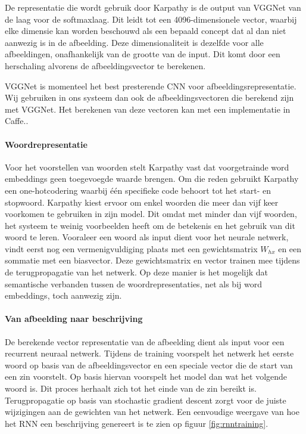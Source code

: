 De representatie die wordt gebruik door Karpathy is de output van VGGNet van de laag voor de softmaxlaag. Dit leidt tot een 4096-dimensionele vector, waarbij elke dimensie kan worden beschouwd als een bepaald concept dat al dan niet aanwezig is in de afbeelding. Deze dimensionaliteit is dezelfde voor alle afbeeldingen, onafhankelijk van de grootte van de input. Dit komt door een herschaling alvorens de afbeeldingsvector te berekenen.

VGGNet is momenteel het best presterende CNN voor afbeeldingsrepresentatie. Wij gebruiken in ons systeem dan ook de afbeeldingsvectoren die berekend zijn met VGGNet. Het berekenen van deze vectoren kan met een implementatie in Caffe.\cite{Jia2014}.

\paragraph{Woordrepresentatie}
Voor het voorstellen van woorden stelt Karpathy\cite{Karpathy2015} vast dat voorgetrainde word embeddings geen toegevoegde waarde brengen. Om die reden gebruikt Karpathy een one-hotcodering waarbij \'e\'en specifieke code behoort tot het start- en stopwoord. Karpathy kiest ervoor om enkel woorden die meer dan vijf keer voorkomen te gebruiken in zijn model. Dit omdat met minder dan vijf woorden, het systeem te weinig voorbeelden heeft om de betekenis en het gebruik van dit woord te leren. Vooraleer een woord als input dient voor het neurale netwerk, vindt eerst nog een vermenigvuldiging plaats met een gewichtsmatrix $W_{hx}$ en een sommatie met een biasvector. Deze gewichtsmatrix en vector trainen mee tijdens de terugpropagatie van het netwerk. Op deze manier is het mogelijk dat semantische verbanden tussen de woordrepresentaties, net als bij word embeddings, toch aanwezig zijn.

\paragraph{Van afbeelding naar beschrijving}
De berekende vector representatie van de afbeelding dient als input voor een recurrent neuraal netwerk. Tijdens de training voorspelt het netwerk het eerste woord op basis van de afbeeldingsvector en een speciale vector die de start van een zin voorstelt. Op basis hiervan voorspelt het model dan wat het volgende woord is. Dit proces herhaalt zich tot het einde van de zin bereikt is. Terugpropagatie op basis van stochastic gradient descent zorgt voor de juiste wijzigingen aan de gewichten van het netwerk. Een eenvoudige weergave van hoe het RNN een beschrijving genereert is te zien op figuur \ref{fig:rnntraining}.

